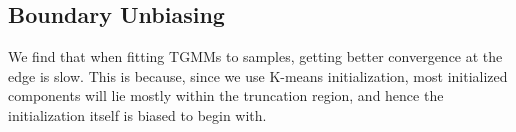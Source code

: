 \documentclass[twocolumn,usenames,dvipsnames,linenumbers]{aastex631}
\begin{document}

\subsection{Boundary Unbiasing}
We find that when fitting TGMMs to samples, getting better convergence at the edge is slow. This is because, since we use K-means initialization, most initialized components will lie mostly within the truncation region, and hence the initialization itself is biased to begin with. 
\end{document}
